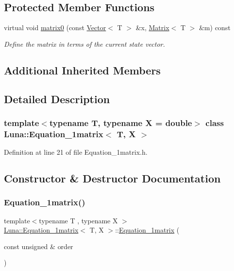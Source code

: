 \subsection*{Protected Member Functions}
\begin{DoxyCompactItemize}
\item 
virtual void \hyperlink{classLuna_1_1Equation__1matrix_a2501535a6e92abc491bc491b3f64dc06}{matrix0} (const \hyperlink{classLuna_1_1Vector}{Vector}$<$ T $>$ \&x, \hyperlink{classLuna_1_1Matrix}{Matrix}$<$ T $>$ \&m) const
\begin{DoxyCompactList}\small\item\em Define the matrix in terms of the current state vector. \end{DoxyCompactList}\end{DoxyCompactItemize}
\subsection*{Additional Inherited Members}


\subsection{Detailed Description}
\subsubsection*{template$<$typename T, typename X = double$>$\newline
class Luna\+::\+Equation\+\_\+1matrix$<$ T, X $>$}



Definition at line 21 of file Equation\+\_\+1matrix.\+h.



\subsection{Constructor \& Destructor Documentation}
\mbox{\label{classLuna_1_1Equation__1matrix_af76f7d2d3a138e8071390eb579fd2c4e}} 
\subsubsection{\texorpdfstring{Equation\+\_\+1matrix()}{Equation\_1matrix()}}
{\footnotesize\ttfamily template$<$typename T , typename X $>$ \\
\hyperlink{classLuna_1_1Equation__1matrix}{Luna\+::\+Equation\+\_\+1matrix}$<$ T, X $>$\+::\hyperlink{classLuna_1_1Equation__1matrix}{Equation\+\_\+1matrix} (\begin{DoxyParamCaption}\item[{const unsigned \&}]{order }\end{DoxyParamCaption})\hspace{0.3cm}{\ttfamily [explicit]}}



